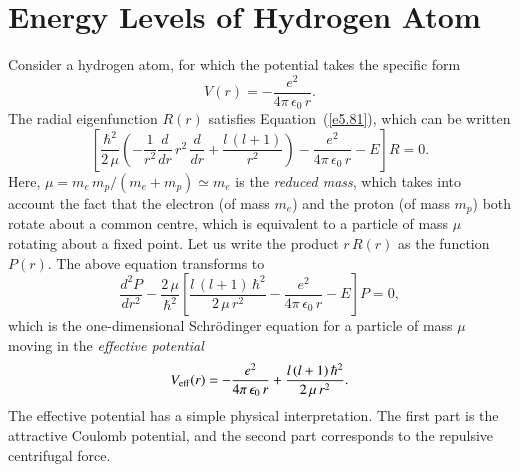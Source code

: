 \section{Energy Levels of  Hydrogen Atom}\label{s5.6}
Consider a hydrogen atom, for which the potential takes the specific form
\begin{equation}
V(r) = -\frac{e^2}{4\pi\,\epsilon_0\,r}.
\end{equation}
The radial eigenfunction $R(r)$ satisfies Equation~(\ref{e5.81}), which can be written
\begin{equation}
\left[\frac{\hbar^2}{2\,\mu} \left(-\frac{1}{r^2} \frac{d}{dr}\,r^2\,\frac{d}{dr}
+\frac{l\,(l+1)}{r^2}\right)   -\frac{e^2}{4\pi\,\epsilon_0\,r}- E\right] R = 0.
\end{equation}
Here, $\mu = m_e \,m_p/(m_e+ m_p)\simeq m_e$ is the {\em reduced mass}, which takes into
account the fact that the electron (of mass $m_e$) and the proton (of mass $m_p$)
both rotate about a common centre, which is equivalent to a particle of
mass $\mu$ rotating about a fixed point. Let us write the product $r\, R(r)$
as the function $P(r)$. The above equation transforms to
\begin{equation}\label{e5.84}
\frac{d^2 P}{d r^2} - \frac{2\,\mu}{\hbar^2}\left[
\frac{l\,(l+1)\,\hbar^2}{2\,\mu \,r^2} - \frac{e^2}{4\pi \,\epsilon_0 \,r}-E\right] P =0,
\end{equation}
which is the one-dimensional Schr\"{o}dinger equation for a particle of
mass $\mu$ moving in the {\em effective potential}\/
\begin{equation}
V_{\rm eff}(r) = -\frac{e^2}{4\pi \,\epsilon_0 \,r} + \frac{l\,(l+1)\,\hbar^2}{2\,\mu\, r^2}.
\end{equation}
The effective potential has a simple physical interpretation. The first part is the
attractive Coulomb potential, and the second part corresponds
to the repulsive centrifugal force.

